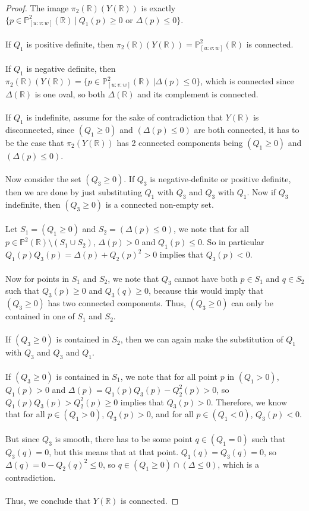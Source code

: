 \documentclass{article}
\newcommand{\Rbb}{\mathbb{R}}
\newcommand{\Pbb}{\mathbb{P}}
\begin{document}
\begin{proof}
The image $\pi_2(\Rbb)(Y(\Rbb))$ is exactly $\{p \in \Pbb^2_{[u:v:w]}(\Rbb)\ |\ Q_1(p) \geq 0 \text{ or } \Delta(p) \leq 0\}$.\\\\
If $Q_1$ is positive definite, then $\pi_2(\Rbb)(Y(\Rbb)) = \Pbb^2_{[u:v:w]}(\Rbb)$ is connected.\\\\
If $Q_1$ is negative definite, then $\pi_2(\Rbb)(Y(\Rbb)) = \{p \in \Pbb^2_{[u:v:w]}(\Rbb)\ | \Delta(p) \leq 0\}$, which is connected since $\Delta(\Rbb)$ is one oval, so both $\Delta(\Rbb)$ and its complement is connected.\\\\
If $Q_1$ is indefinite, assume for the sake of contradiction that $Y(\Rbb)$ is disconnected, since $(Q_1 \geq 0)$ and $(\Delta(p) \leq 0)$ are both connected, it has to be the case that $\pi_2(Y(\Rbb))$ has 2 connected components being $(Q_1 \geq 0)$ and $(\Delta(p) \leq 0)$.\\\\
Now consider the set $(Q_3 \geq 0)$. If $Q_3$ is negative-definite or positive definite, then we are done by just substituting $Q_1$ with $Q_3$ and $Q_3$ with $Q_1$. Now if $Q_3$ indefinite, then $(Q_3 \geq 0)$ is a connected non-empty set.\\\\
Let $S_1 = (Q_1 \geq 0)$ and $S_2 = (\Delta(p) \leq 0)$, we note that for all $p \in \Pbb^2(\Rbb) \setminus (S_1 \cup S_2)$, $\Delta(p) > 0$ and $Q_1(p) \leq 0$. So in particular $Q_1(p)Q_3(p) = \Delta(p) + Q_2(p)^2 > 0$ implies that $Q_3(p) < 0$.\\\\
Now for points in $S_1$ and $S_2$, we note that $Q_3$ cannot have both $p \in S_1$ and $q \in S_2$ such that $Q_3(p) \geq 0$ and $Q_3(q) \geq 0$, because this would imply that $(Q_3 \geq 0)$ has two connected components. Thus, $(Q_3 \geq 0)$ can only be contained in one of $S_1$ and $S_2$.\\\\
If $(Q_3 \geq 0)$ is contained in $S_2$, then we can again make the substitution of $Q_1$ with $Q_3$ and $Q_3$ and $Q_1$.\\\\
If $(Q_3 \geq 0)$ is contained in $S_1$, we note that for all point $p$ in $(Q_1 > 0)$, $Q_1(p) > 0$ and $\Delta(p) = Q_1(p)Q_3(p) - Q_2^2(p) > 0$, so $Q_1(p)Q_3(p) > Q_2^2(p) \geq 0$ implies that $Q_3(p) > 0$. Therefore, we know that for all $p \in (Q_1 > 0)$, $Q_3(p) > 0$, and for all $p \in (Q_1 < 0)$, $Q_3(p) < 0$.\\\\
But since $Q_3$ is smooth, there has to be some point $q \in (Q_1 = 0)$ such that $Q_3(q) = 0$, but this means that at that point. $Q_1(q) = Q_3(q) = 0$, so $\Delta(q) = 0 - Q_2(q)^2 \leq 0$, so $q \in (Q_1 \geq 0) \cap (\Delta \leq 0)$, which is a contradiction.\\\\
Thus, we conclude that $Y(\Rbb)$ is connected.
\end{proof}
\end{document}
